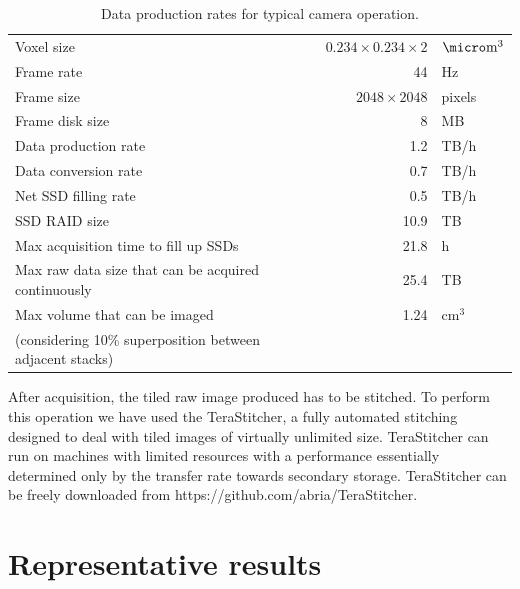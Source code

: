 \documentclass[12pt]{spieman}  %
\begin{document}
\begin{table}%
	\centering
		\caption[Data production]{Data production rates for typical camera operation.\label{tab:dataproduction}}
		\begin{tabular}{lrl}
		\\
		Voxel size																								& $0.234 \times 0.234 \times 2$	& $\micro\text{m}^3$ 	\\
		Frame rate																								& 44														& Hz								\\
		Frame size																								& $2048 \times 2048$ 						& pixels						\\
		Frame disk size																						& 8									 						& MB								\\
		Data production rate																			& 1.2								 						& TB/h 							\\
		Data conversion rate																			& 0.7								 						& TB/h 							\\
		Net SSD filling rate																			& 0.5								 						& TB/h 							\\
		SSD RAID size																							& 10.9							 						& TB								\\
		Max acquisition time to fill up SSDs											& 21.8							 						& h									\\
		Max raw data size that can be acquired continuously				& 25.4							 						& TB								\\
		Max volume that can be imaged 														& 1.24							 						& $\text{cm}^3$ 		\\
		(considering 10\% superposition between adjacent stacks)	&										 						&										\\
		\end{tabular}
\end{table}


After acquisition, the tiled raw image produced has to be stitched. To perform this operation we have used the TeraStitcher\cite{Bria2012}, a fully automated stitching designed to deal with tiled images of virtually unlimited size. TeraStitcher can run on machines with limited resources with a performance essentially determined only by the transfer rate towards secondary storage. TeraStitcher can be freely downloaded from https://github.com/abria/TeraStitcher.

\section{Representative results}
\end{document}
